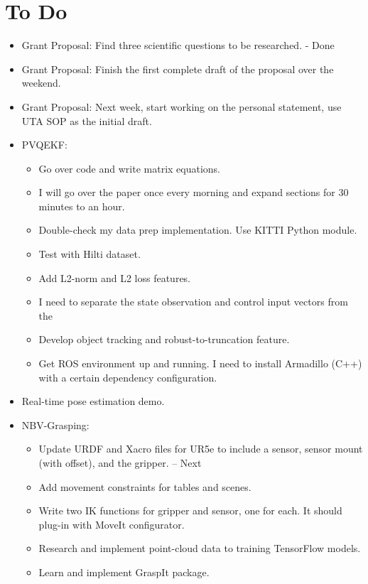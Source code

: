 \documentclass[11pt]{article}
\begin{document}
\section{To Do}
\begin{itemize}
  \item Grant Proposal: Find three scientific questions to be researched. - Done
  \item Grant Proposal: Finish the first complete draft of the proposal over the weekend.
  \item Grant Proposal: Next week, start working on the personal statement, use UTA SOP as the initial draft.
  \item PVQEKF:
  \begin{itemize}
      \item Go over code and write matrix equations.
      \item I will go over the paper once every morning and expand sections for 30 minutes to an hour.
      \item Double-check my data prep implementation. Use KITTI Python module.
      \item Test with Hilti dataset.
      \item Add L2-norm and L2 loss features.
      \item I need to separate the state observation and control input vectors from the
      \item Develop object tracking and robust-to-truncation feature.
      \item Get ROS environment up and running. I need to install Armadillo (C++) with a certain dependency configuration.
  \end{itemize}

  \item Real-time pose estimation demo.
  \item NBV-Grasping:
      \begin{itemize}
      \item Update URDF and Xacro files for UR5e to include a sensor, sensor mount (with offset), and the gripper. -- Next
      \item Add movement constraints for tables and scenes.
      \item Write two IK functions for gripper and sensor, one for each. It should plug-in with MoveIt configurator.
      \item Research and implement point-cloud data to training TensorFlow models.
      \item Learn and implement GraspIt package.
      \end{itemize}
\end{itemize}
\end{document}
